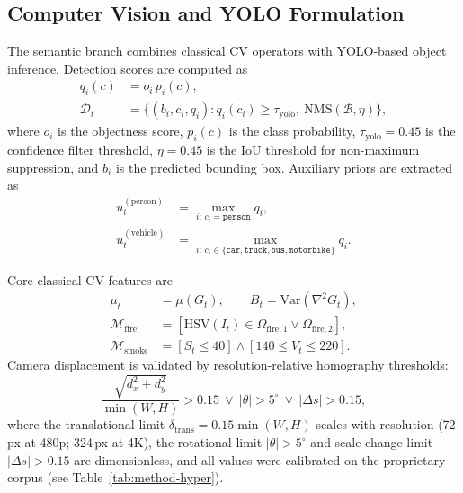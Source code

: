 \documentclass[a4paper,fleqn]{cas-dc}
\begin{document}
\FloatBarrier
\subsection{Computer Vision and YOLO Formulation}
 
The semantic branch combines classical CV operators with YOLO-based object inference. Detection scores are computed as
\begin{equation}
\begin{aligned}
q_i(c) &= o_i\,p_i(c), \\
\mathcal{D}_t &= \{(b_i,c_i,q_i): q_i(c_i)\ge \tau_{\text{yolo}},\ \text{NMS}(\mathcal{B},\eta)\},
\end{aligned}
\end{equation}
where $o_i$ is the objectness score, $p_i(c)$ is the class probability, $\tau_{\text{yolo}}=0.45$ is the confidence filter threshold, $\eta=0.45$ is the IoU threshold for non-maximum suppression, and $b_i$ is the predicted bounding box. Auxiliary priors are extracted as
\begin{equation}
\begin{aligned}
u_t^{(\text{person})}&=\max_{i:\,c_i=\texttt{person}}q_i,\\
u_t^{(\text{vehicle})}&=\max_{i:\,c_i\in\{\texttt{car},\texttt{truck},\texttt{bus},\texttt{motorbike}\}}q_i.
\end{aligned}
\end{equation}
 
Core classical CV features are
\begin{equation}
\begin{aligned}
\mu_t &= \mu(G_t), \qquad B_t = \mathrm{Var}(\nabla^2G_t), \\
\mathcal{M}_{\text{fire}} &= [\mathrm{HSV}(I_t)\in\Omega_{\text{fire},1}\lor \Omega_{\text{fire},2}], \\
\mathcal{M}_{\text{smoke}} &= [S_t\le 40]\land[140\le V_t\le 220].
\end{aligned}
\end{equation}
Camera displacement is validated by resolution-relative homography thresholds:
\begin{equation}
\frac{\sqrt{d_x^2+d_y^2}}{\min(W,H)}>0.15 \ \lor\ |\theta|>5^\circ \ \lor\ |\Delta s|>0.15,
\end{equation}
where the translational limit $\delta_{\text{trans}}=0.15\min(W,H)$ scales with resolution (72\,px at 480p; 324\,px at 4K), the rotational limit $|\theta|>5^\circ$ and scale-change limit $|\Delta s|>0.15$ are dimensionless, and all values were calibrated on the proprietary corpus (see Table~\ref{tab:method-hyper}).
 
\end{document}
